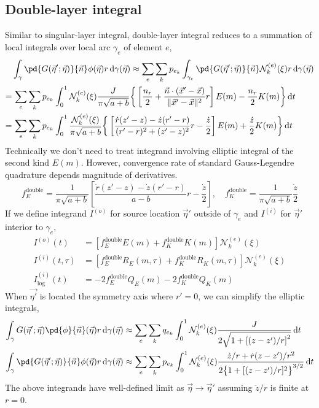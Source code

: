 \documentclass{jfm}
\begin{document}
\subsection{Double-layer integral}
Similar to singular-layer integral, double-layer integral reduces to a summation of local integrals over local arc $\gamma_e$ of element $e$,
\begin{align}
&\nonumber\int_{\gamma}\pd{G(\vec{\eta}';\vec{\eta})}{\vec{n}}\phi(\vec{\eta}) r \,\mathrm{d}\gamma(\vec{\eta})
\approx\sum_e \sum_k p_{e_k}
\int_{\gamma_e}\pd{G(\vec{\eta}';\vec{\eta})}{\vec{n}}\mathcal{N}^{(e)}_k(\xi) r \,\mathrm{d}\gamma(\vec{\eta})\\
=&\nonumber\,\sum_e \sum_k p_{e_k}
\int_0^1\mathcal{N}^{(e)}_k(\xi)
\frac{J}{\pi \sqrt{a+b}}\bigg\{
\left[\frac{n_r}{2}+\frac{\vec{n}\cdot(\vec{x}'-\vec{x})}{\|\vec{x}'-\vec{x}\|^2}r\right]E(m)
-\frac{n_r}{2}K(m)\bigg\}
\,\mathrm{d}t\\
=&\,\sum_e \sum_k p_{e_k}
\int_0^1
\frac{\mathcal{N}^{(e)}_k(\xi)}{\pi \sqrt{a+b}}\bigg\{
\left[\frac{\dot{r}(z'-z)-\dot{z}(r'-r)}{(r'-r)^2+(z'-z)^2}r
-\frac{\dot{z}}{2}\right]E(m)
+\frac{\dot{z}}{2}K(m)\bigg\}
\,\mathrm{d}t
\end{align}
Technically we don't need to treat integrand involving elliptic integral of the second kind $E(m)$.
However, convergence rate of standard Gauss-Legendre quadrature  depends magnitude of derivatives.
\begin{equation}
f_E^\mathrm{double}=\frac{1}{\pi \sqrt{a+b}}
\left[\frac{\dot{r}(z'-z)-\dot{z}(r'-r)}{a-b}r
-\frac{\dot{z}}{2}\right],\quad
f_K^\mathrm{double}=\frac{1}{\pi \sqrt{a+b}}
\frac{\dot{z}}{2}
\end{equation}
If we define integrand $I^{(o)}$ for source location $\vec{\eta}'$ outside of $\gamma_e$
and $I^{(i)}$ for $\vec{\eta}'$ interior to $\gamma_e$,
\begin{align}
I^{(o)}(t) &= \left[ f_E^\mathrm{double} E(m)+f_K^\mathrm{double} K(m)\right]\mathcal{N}^{(e)}_k(\xi)\\
I^{(i)}(t,\tau) &= \left[f_E^\mathrm{double}R_E(m,\tau)+ f_K^\mathrm{double}R_K(m,\tau)\right]\mathcal{N}^{(e)}_k(\xi)\\
I^{(i)}_\mathrm{log}(t) &=-2 f_E^\mathrm{double}Q_E(m) -2 f_K^\mathrm{double}Q_K(m) 
\end{align}
When $\vec{\eta'}$ is located the symmetry axis where $r'=0$,
we can simplify the elliptic integrals,
\begin{align}
\int_{\gamma}G(\vec{\eta}';\vec{\eta})
\pd{\phi}{\vec{n}}(\vec{\eta}) r \,\mathrm{d}\gamma(\vec{\eta})
&\approx\sum_e \sum_k q_{e_k}
\int_0^1\mathcal{N}^{(e)}_k(\xi)\frac{   J }{
2 \sqrt{1+\left[(z-z')/r\right]^2}}\,\mathrm{d}t\\
\int_{\gamma}\pd{G(\vec{\eta}';\vec{\eta})}{\vec{n}}\phi(\vec{\eta}) r \,\mathrm{d}\gamma(\vec{\eta})
&\approx\sum_e \sum_k p_{e_k}
\int_0^1\mathcal{N}^{(e)}_k(\xi) \frac{  
\dot{z}/r+\dot{r}(z-z')/r^2
}{
2\big\{1+[(z-z')/r]^2\big\}^{3/2}
}\,\mathrm{d}t
\end{align}
The above integrands have well-defined limit as $\vec{\eta}\to\vec{\eta}'$
assuming $\ddot{z}/\dot{r}$ is finite at $r=0$.
\end{document}
